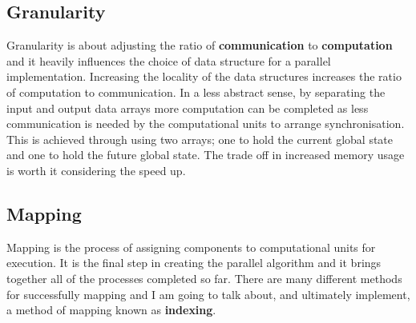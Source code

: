 \documentclass[11pt]{article} %
\begin{document}
\subsection*{Granularity}
Granularity is about adjusting the ratio of {\bf communication} to {\bf computation} and it heavily influences the choice of data structure for a parallel implementation. Increasing the locality of the data structures increases the ratio of computation to communication. In a less abstract sense, by separating the input and output data arrays more computation can be completed as less communication is needed by the computational units to arrange synchronisation. This is achieved through using two arrays; one to hold the current global state and one to hold the future global state. The trade off in increased memory usage is worth it considering the speed up.\cite[p87]{ref9}
\subsection*{Mapping}
Mapping is the process of assigning components to computational units for execution. It is the final step in creating the parallel algorithm and it brings together all of the processes completed so far. There are many different methods for successfully mapping and I am going to talk about, and ultimately implement, a method of mapping known as {\bf indexing}.
\end{document}
